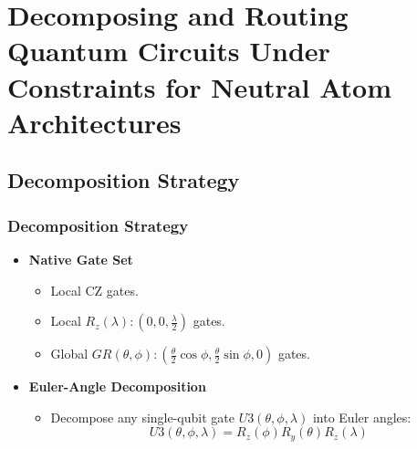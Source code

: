 \documentclass[18 pt]{beamer}
\begin{document}
\section{Decomposing and Routing Quantum Circuits Under Constraints for Neutral Atom Architectures}


\subsection{Decomposition Strategy}
\begin{frame}
    \frametitle{Decomposition Strategy}
    \begin{itemize}
        \item \textbf{Native Gate Set}
        \begin{itemize}
            \item Local CZ gates.
            \item Local $R_z(\lambda): (0,0,\frac{\lambda}{2})$ gates.
            \item Global $GR(\theta, \phi):(\frac{\theta}{2}\cos{\phi},\frac{\theta}{2}\sin{\phi},0)$ gates.
        \end{itemize}
        \item \textbf{Euler-Angle Decomposition}
        \begin{itemize}
            \item Decompose any single-qubit gate $U3(\theta, \phi, \lambda)$ into Euler angles:
            \[
            U3(\theta, \phi, \lambda) = R_z(\phi) R_y(\theta) R_z(\lambda)
            \]
        \end{itemize}
    \end{itemize}
\end{frame}
\end{document}
